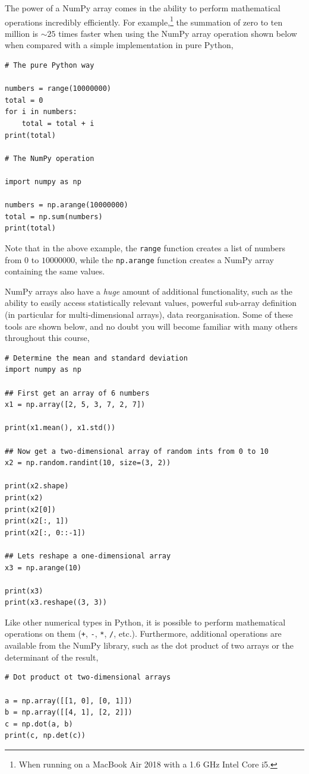 \documentclass[a4paper]{article}
\begin{document}
The power of a NumPy array comes in the ability to perform mathematical operations incredibly efficiently.
For example,\footnote{When running on a MacBook Air 2018 with a 1.6 GHz Intel Core i5.} the summation of zero to ten million is $\sim 25$ times faster when using the NumPy array operation shown below when compared with a simple implementation in pure Python,
\begin{lstlisting}
# The pure Python way

numbers = range(10000000)
total = 0
for i in numbers:
    total = total + i
print(total)

# The NumPy operation

import numpy as np

numbers = np.arange(10000000)
total = np.sum(numbers)
print(total)
\end{lstlisting}
Note that in the above example, the \texttt{range} function creates a list of numbers from $0$ to $10000000$, while the \texttt{np.arange} function creates a NumPy array containing the same values.

NumPy arrays also have a \emph{huge} amount of additional functionality, such as the ability to easily access statistically relevant values, powerful sub-array definition (in particular for multi-dimensional arrays), data reorganisation.
Some of these tools are shown below, and no doubt you will become familiar with many others throughout this course,
\begin{lstlisting}
# Determine the mean and standard deviation
import numpy as np

## First get an array of 6 numbers
x1 = np.array([2, 5, 3, 7, 2, 7])

print(x1.mean(), x1.std())

## Now get a two-dimensional array of random ints from 0 to 10
x2 = np.random.randint(10, size=(3, 2))

print(x2.shape)
print(x2)
print(x2[0])
print(x2[:, 1])
print(x2[:, 0::-1])

## Lets reshape a one-dimensional array
x3 = np.arange(10)

print(x3)
print(x3.reshape((3, 3))
\end{lstlisting}

Like other numerical types in Python, it is possible to perform mathematical operations on them (\texttt{+}, \texttt{-}, \texttt{*}, \texttt{/}, etc.).
Furthermore, additional operations are available from the NumPy library, such as the dot product of two arrays or the determinant of the result,
\begin{lstlisting}
# Dot product ot two-dimensional arrays

a = np.array([[1, 0], [0, 1]])
b = np.array([[4, 1], [2, 2]])
c = np.dot(a, b)
print(c, np.det(c))
\end{lstlisting}
\end{document}
